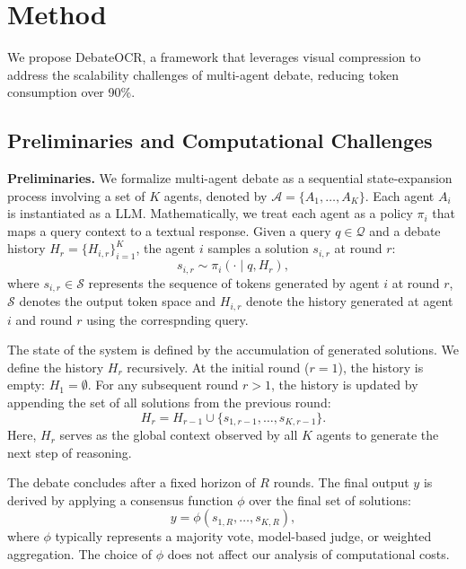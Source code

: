 \documentclass{article}
\theoremstyle{plain}
\theoremstyle{definition}
\theoremstyle{remark}
\begin{document}
\section{Method}
\label{sec:method}

We propose DebateOCR, a framework that leverages visual compression to address the scalability challenges of multi-agent debate, reducing token consumption over 90\%.


\subsection{Preliminaries and Computational Challenges}
\label{subsec:mad_preliminaries}

\textbf{Preliminaries.} 
We formalize multi-agent debate as a sequential state-expansion process involving 
a set of $K$ agents, denoted by $\mathcal{A} = \{A_1, \dots, A_K\}$. Each agent 
$A_i$ is instantiated as a LLM. Mathematically, we treat 
each agent as a policy $\pi_i$ that maps a query context to a textual response. 
Given a query $q \in \mathcal{Q}$ and a debate history $H_r = \{H_{i,r}\}_{i=1}^K$, the agent $i$ samples 
a solution $s_{i,r}$ at round $r$:
\begin{equation}
\label{eq:policy}
    s_{i,r} \sim \pi_i(\cdot \mid q, H_r),
\end{equation}
where $s_{i,r} \in \mathcal{S}$ represents the sequence of tokens generated by 
agent $i$ at round $r$, $\mathcal{S}$ denotes the output token space and $H_{i,r}$ denote the history generated at agent $i$ and round $r$ using the correspnding query.

The state of the system is defined by the accumulation of generated solutions. 
We define the history $H_r$ recursively. At the initial round ($r=1$), the 
history is empty: $H_1 = \emptyset$. For any subsequent round $r > 1$, the 
history is updated by appending the set of all solutions from the previous round:
\begin{equation}
\label{eq:history}
    H_r = H_{r-1} \cup \{ s_{1, r-1}, \dots, s_{K, r-1} \}.
\end{equation}
Here, $H_r$ serves as the global context observed by all $K$ agents to generate 
the next step of reasoning.

The debate concludes after a fixed horizon of $R$ rounds. The final output $y$ 
is derived by applying a consensus function $\phi$ over the final set of solutions:
\begin{equation}
    y = \phi\left( s_{1,R}, \dots, s_{K,R} \right),
\end{equation}
where $\phi$ typically represents a majority vote, model-based judge, or weighted 
aggregation. The choice of $\phi$ does not affect our analysis of computational 
costs.
\end{document}
